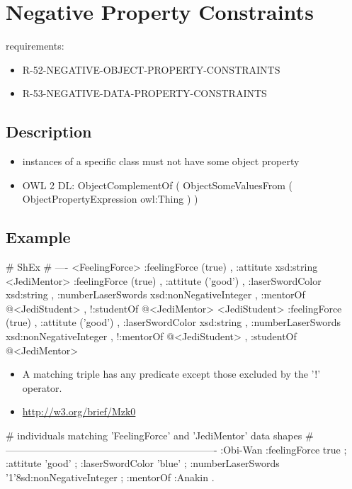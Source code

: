 \documentclass{llncs}
\begin{document}
\section{Negative Property Constraints}

requirements:

\begin{itemize}
	\item R-52-NEGATIVE-OBJECT-PROPERTY-CONSTRAINTS
	\item R-53-NEGATIVE-DATA-PROPERTY-CONSTRAINTS
\end{itemize}

\subsection{Description}

\begin{itemize}
	\item instances of a specific class must not have some object property
  \item OWL 2 DL: ObjectComplementOf ( ObjectSomeValuesFrom ( ObjectPropertyExpression owl:Thing ) )
\end{itemize}

\subsection{Example}

\begin{ex}
# ShEx
# ----
<FeelingForce> {
    :feelingForce (true) ,
    :attitute xsd:string }
<JediMentor> {
    :feelingForce (true) ,
    :attitute ('good') ,
    :laserSwordColor xsd:string ,
    :numberLaserSwords xsd:nonNegativeInteger ,
    :mentorOf @<JediStudent> ,
   !:studentOf @<JediMentor> }
<JediStudent> {
    :feelingForce (true) ,
    :attitute ('good') ,
    :laserSwordColor xsd:string ,
    :numberLaserSwords xsd:nonNegativeInteger ,
   !:mentorOf @<JediStudent> ,
    :studentOf @<JediMentor> }
\end{ex}

\begin{itemize}
	\item A matching triple has any predicate except those excluded by the '!' operator.
  \item \url{http://w3.org/brief/Mzk0}
\end{itemize}

\begin{ex}
# individuals matching 'FeelingForce' and 'JediMentor' data shapes
# ----------------------------------------------------------------
:Obi-Wan 
    :feelingForce true ;
    :attitute 'good' ;
    :laserSwordColor 'blue' ;
    :numberLaserSwords '1'^^xsd:nonNegativeInteger ;
    :mentorOf :Anakin .
\end{ex}
\end{document}
